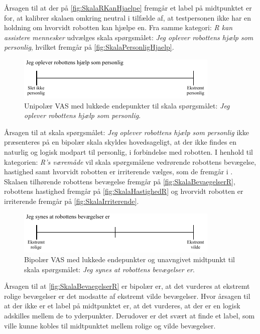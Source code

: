 \noindent
%
Årsagen til at der på \autoref{fig:SkalaRKanHjaelpe} fremgår et label på midtpunktet er for, at kalibrer skalaen omkring neutral i tilfælde af, at testpersonen ikke har en holdning om hvorvidt robotten kan hjælpe en. Fra samme kategori: \textit{R kan assistere mennesker} udvælges skala spørgsmålet: \textit{Jeg oplever robottens hjælp som personlig}, hvilket fremgår på \autoref{fig:SkalaPersonligHjaelp}.
%
\begin{figure}[H]
\centering
\includegraphics[width =\textwidth]{Figure/UdvalgteSkalaer/PersonligHjaelp} 
\caption{Unipolær VAS med lukkede endepunkter til skala spørgsmålet: \textit{Jeg oplever robottens hjælp som personlig}.}
\label{fig:SkalaPersonligHjaelp}
\end{figure}
\noindent
%
Årsagen til at skala spørgsmålet: \textit{Jeg oplever robottens hjælp som personlig} ikke præsenteres på en bipolær skala skyldes hovedsageligt, at der ikke findes en naturlig og logisk modpart til personlig, i forbindelse med robotten.\blankline
%
I henhold til kategorien: \textit{R's væremåde} vil skala spørgsmålene vedrørende robottens bevægelse, hastighed samt hvorvidt robotten er irriterende vælges, som de fremgår i . Skalaen tilhørende robottens bevægelse fremgår på \autoref{fig:SkalaBevaegelserR}, robottens hastighed fremgår på \autoref{fig:SkalaHastighedR} og hvorvidt robotten er irriterende fremgår på \autoref{fig:SkalaIrriterende}.  
%
\begin{figure}[H]
\centering
\includegraphics[width =\textwidth]{Figure/UdvalgteSkalaer/BevaegelserR} 
\caption{Bipolær VAS med lukkede endepunkter og unavngivet midtpunkt til skala spørgsmålet: \textit{Jeg synes at robottens bevægelser er}.}
\label{fig:SkalaBevaegelserR}
\end{figure}
\noindent
%
Årsagen til at \autoref{fig:SkalaBevaegelserR} er bipolær er, at det vurderes at ekstremt rolige bevægelser er det modsatte af ekstremt vilde bevægelser. Hvor årsagen til at der ikke er et label på midtpunktet er, at det vurderes, at der er en logisk adskilles mellem de to yderpunkter. Derudover er det svært at finde et label, som ville kunne kobles til midtpunktet mellem rolige og vilde bevægelser.
